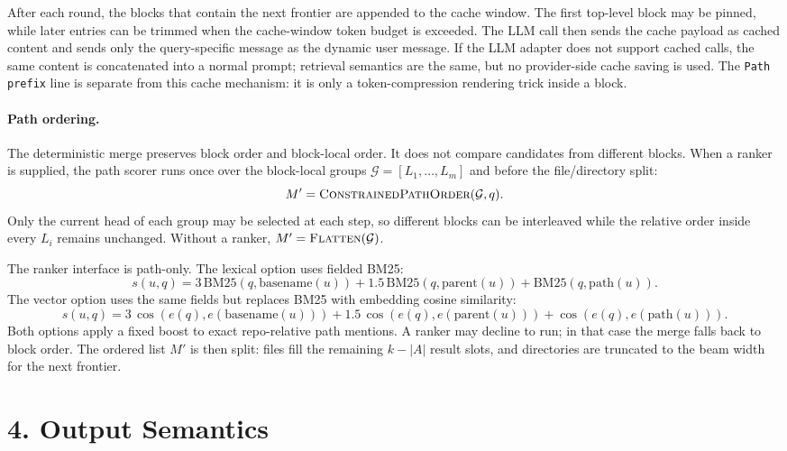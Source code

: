 \documentclass{article}
\begin{document}
After each round, the blocks that contain the next frontier are appended to the
cache window. The first top-level block may be pinned, while later entries can be
trimmed when the cache-window token budget is exceeded. The LLM call then sends
the cache payload as cached content and sends only the query-specific message as
the dynamic user message. If the LLM adapter does not support cached calls, the
same content is concatenated into a normal prompt; retrieval semantics are the
same, but no provider-side cache saving is used. The \texttt{Path prefix} line
is separate from this cache mechanism: it is only a token-compression rendering
trick inside a block.

\paragraph{Path ordering.}
The deterministic merge preserves block order and block-local order. It does not
compare candidates from different blocks. When a ranker is supplied, the path
scorer runs once over the block-local groups
$\mathcal{G}=[L_1,\ldots,L_m]$ and before the file/directory split:
\[
M'=\Call{ConstrainedPathOrder}{\mathcal{G},q}.
\]
Only the current head of each group may be selected at each step, so different
blocks can be interleaved while the relative order inside every $L_i$ remains
unchanged. Without a ranker, $M'=\Call{Flatten}{\mathcal{G}}$.

The ranker interface is path-only. The lexical option uses fielded BM25:
\[
s(u,q)=3\,\mathrm{BM25}(q,\mathrm{basename}(u))
      +1.5\,\mathrm{BM25}(q,\mathrm{parent}(u))
      +\mathrm{BM25}(q,\mathrm{path}(u)).
\]
The vector option uses the same fields but replaces BM25 with embedding cosine
similarity:
\[
s(u,q)=3\,\cos(e(q),e(\mathrm{basename}(u)))
      +1.5\,\cos(e(q),e(\mathrm{parent}(u)))
      +\cos(e(q),e(\mathrm{path}(u))).
\]
Both options apply a fixed boost to exact repo-relative path mentions. A ranker
may decline to run; in that case the merge falls back to block order.
The ordered list $M'$ is then split: files fill the remaining $k-|A|$ result
slots, and directories are truncated to the beam width for the next frontier.

\section*{4. Output Semantics}
\end{document}

